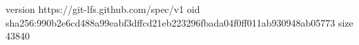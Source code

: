 version https://git-lfs.github.com/spec/v1
oid sha256:990b2e6cd488a99eabf3dffcd21eb223296fbada04f0ff011ab930948ab05773
size 43840
